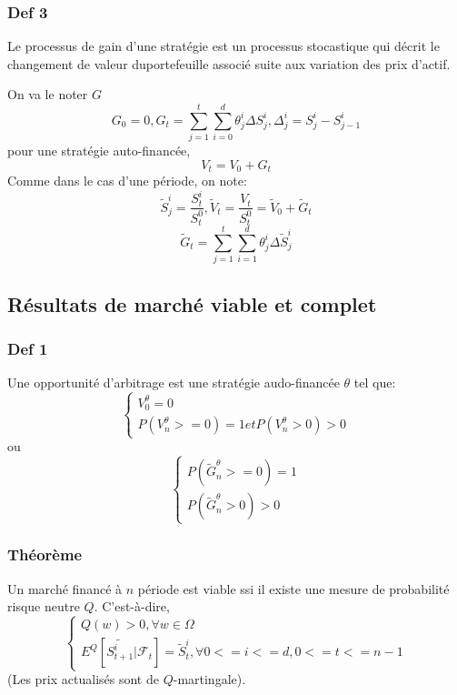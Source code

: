 \documentclass{article}
\begin{document}
\subsubsection{Def 3}
Le processus de gain d'une strat\'egie est un processus stocastique qui d\'ecrit le changement de valeur duportefeuille associ\'e suite aux variation des prix d'actif. 

On va le noter $G$
\begin{equation}
G_0=0,G_t=\sum_{j=1}^t\sum_{i=0}^d \theta_j^i\Delta S_j^i,\Delta_j^i=S_j^i-S_{j-1}^i
\end{equation}
pour une strat\'egie auto-financ\'ee,
\begin{equation}
V_t=V_0+G_t
\end{equation}
Comme dans le cas d'une p\'eriode, on note:
\begin{equation}
\tilde{S}_j^i=\frac{S_t^i}{S_t^0},\tilde{V}_t=\frac{V_t}{S_t^0}=\tilde{V}_0+\tilde{G}_t
\end{equation}
\begin{equation}
\tilde{G}_t=\sum_{j=1}^t\sum_{i=1}^d \theta_j^i \Delta \tilde{S}_j^i
\end{equation}

\subsection{R\'esultats de march\'e viable et complet}

\subsubsection{Def 1}
Une opportunit\'e d'arbitrage est une strat\'egie audo-financ\'ee $\theta$ tel que:
\begin{equation}
\left\{\begin{array}{rcl}
V_0^\theta=0 \\
P(V_n^\theta >= 0)=1 et P(V_n^\theta >0)>0
\end{array}\right.
\end{equation}
ou
\begin{equation}
\left\{\begin{array}{rcl}
P(\tilde{G}_n^\theta>=0)=1\\
P(\tilde{G}_n^\theta>0)>0
\end{array}\right.
\end{equation}

\subsubsection{Th\'eor\`eme}
Un march\'e financ\'e \`a $n$ p\'eriode est viable ssi il existe une mesure de probabilit\'e risque neutre $Q$. C'est-\`a-dire,
\begin{equation}
\left\{\begin{array}{rcl}
Q(w)>0,\forall w\in\Omega\\
E^Q[\tilde{S_{t+1}^i}|\mathcal{F}_t]=\tilde{S}_t^i,\forall 0<=i<=d,0<=t<=n-1
\end{array}\right.
\end{equation}
(Les prix actualis\'es sont de $Q$-martingale).
\end{document}
